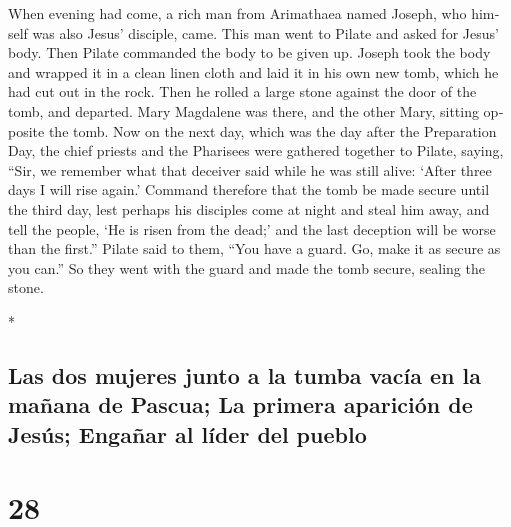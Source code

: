 \begin{paracol}{2}
\begin{otherlanguage}{english}
 When evening had come, a rich man from Arimathaea named
Joseph, who himself was also Jesus' disciple, came.  This
man went to Pilate and asked for Jesus' body. Then Pilate commanded the
body to be given up.  Joseph took the body and wrapped it
in a clean linen cloth  and laid it in his own new tomb,
which he had cut out in the rock. Then he rolled a large stone against
the door of the tomb, and departed.  Mary Magdalene was
there, and the other Mary, sitting opposite the tomb. 
Now on the next day, which was the day after the Preparation Day, the
chief priests and the Pharisees were gathered together to Pilate,
 saying, ``Sir, we remember what that deceiver said while
he was still alive: `After three days I will rise again.'
 Command therefore that the tomb be made secure until the
third day, lest perhaps his disciples come at night and steal him away,
and tell the people, `He is risen from the dead;' and the last deception
will be worse than the first.''  Pilate said to them,
``You have a guard. Go, make it as secure as you can.'' 
So they went with the guard and made the tomb secure, sealing the stone.

\end{otherlanguage}

\switchcolumn[0]*

\hypertarget{las-dos-mujeres-junto-a-la-tumba-vacuxeda-en-la-mauxf1ana-de-pascua-la-primera-apariciuxf3n-de-jesuxfas-engauxf1ar-al-luxedder-del-pueblo}{%
\subsection{Las dos mujeres junto a la tumba vacía en la mañana de
Pascua; La primera aparición de Jesús; Engañar al líder del
pueblo}\label{las-dos-mujeres-junto-a-la-tumba-vacuxeda-en-la-mauxf1ana-de-pascua-la-primera-apariciuxf3n-de-jesuxfas-engauxf1ar-al-luxedder-del-pueblo}}

\hypertarget{section-54}{%
\section{28}\label{section-54}}


\end{paracol}
